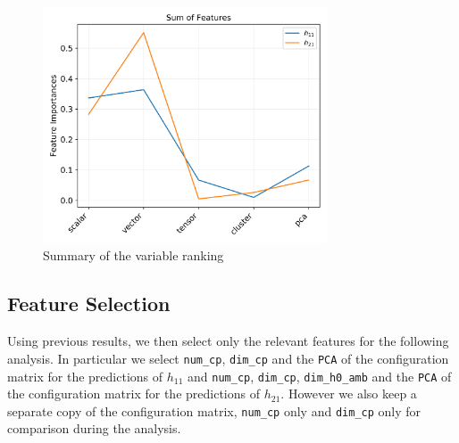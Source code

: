     \begin{figure}[!t]
        \centering
        \includegraphics[width=0.75\textwidth]{tex/img/feature_importances_sum.png}
        \caption{Summary of the variable ranking}
        \label{fig:summary_importances}
    \end{figure}
    
\subsection{Feature Selection}

    Using previous results, we then select only the relevant features for the following analysis. In particular we select \texttt{num\_cp}, \texttt{dim\_cp} and the \texttt{PCA} of the configuration matrix for the predictions of $h_{11}$ and \texttt{num\_cp}, \texttt{dim\_cp}, \texttt{dim\_h0\_amb} and the \texttt{PCA} of the configuration matrix for the predictions of $h_{21}$. However we also keep a separate copy of the configuration matrix, \texttt{num\_cp} only and \texttt{dim\_cp} only for comparison during the analysis.